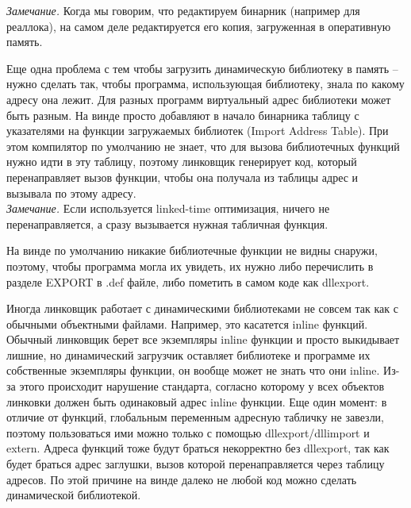 \documentclass[12pt, a4paper]{article}
\begin{document}
\textit{Замечание.} Когда мы говорим, что редактируем бинарник (например для реаллока), на самом деле редактируется его копия, загруженная в оперативную память.\\
\par Еще одна проблема с тем чтобы загрузить динамическую библиотеку в память -- нужно сделать так, чтобы программа, использующая библиотеку, знала по какому адресу она лежит. Для разных программ виртуальный адрес библиотеки может быть разным. На винде просто добавляют в начало бинарника таблицу с указателями на функции загружаемых библиотек (Import Address Table). При этом компилятор по умолчанию не знает, что для вызова библиотечных функций нужно идти в эту таблицу, поэтому линковщик генерирует код, который перенаправляет вызов функции, чтобы она получала из таблицы адрес и вызывала по этому адресу.\\
\textit{Замечание.} Если используется linked-time оптимизация, ничего не перенаправляется, а сразу вызывается нужная табличная функция.
\par На винде по умолчанию никакие библиотечные функции не видны снаружи, поэтому, чтобы программа могла их увидеть, их нужно либо перечислить в разделе EXPORT в .def файле, либо пометить в самом коде как dllexport.\\
\par Иногда линковщик работает с динамическими библиотеками не совсем так как с обычными объектными файлами. Например, это касатется inline функций. Обычный линковщик берет все экземпляры inline функции и просто выкидывает лишние, но динамический загрузчик оставляет библиотеке и программе их собственные экземпляры функции, он вообще может не знать что они inline. Из-за этого происходит нарушение стандарта, согласно которому у всех объектов линковки должен быть одинаковый адрес inline функции. Еще один момент: в отличие от функций, глобальным переменным адресную табличку не завезли, поэтому пользоваться ими можно только с помощью dllexport/dllimport и extern. Адреса функций тоже будут браться некорректно без dllexport, так как будет браться адрес заглушки, вызов которой перенаправляется через таблицу адресов. По этой причине на винде далеко не любой код можно сделать динамической библиотекой. \\
\end{document}
